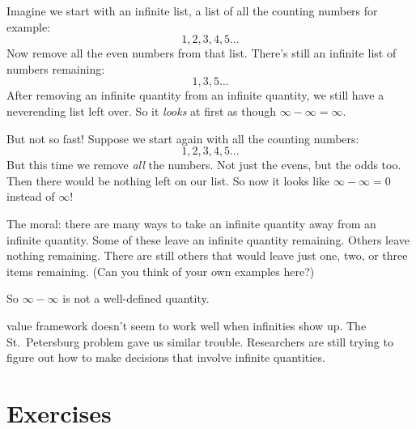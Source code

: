\documentclass[justified]{tufte-book}
\theoremstyle{definition}
\theoremstyle{definition}
\theoremstyle{definition}
\theoremstyle{definition}
\theoremstyle{remark}
\begin{document}
Imagine we start with an infinite list, a list of all the counting numbers for example:
\[ 1, 2, 3, 4, 5 \ldots \]
Now remove all the even numbers from that list. There's still an infinite list of numbers remaining:
\[ 1, 3, 5 \ldots \]
After removing an infinite quantity from an infinite quantity, we still have a neverending list left over. So it \emph{looks} at first as though \(\infty - \infty = \infty\).

But not so fast! Suppose we start again with all the counting numbers:
\[ 1, 2, 3, 4, 5 \ldots \]
But this time we remove \emph{all} the numbers. Not just the evens, but the odds too. Then there would be nothing left on our list. So now it looks like \(\infty - \infty = 0\) instead of \(\infty\)!

The moral: there are many ways to take an infinite quantity away from an infinite quantity. Some of these leave an infinite quantity remaining. Others leave nothing remaining. There are still others that would leave just one, two, or three items remaining. (Can you think of your own examples here?)

So \(\infty - \infty\) is not a well-defined quantity.

 value framework doesn't seem to work well when infinities show up. The St.~Petersburg problem gave us similar trouble. Researchers are still trying to figure out how to make decisions that involve infinite quantities.

\hypertarget{exercises-12}{%
\section*{Exercises}\label{exercises-12}}
\end{document}
